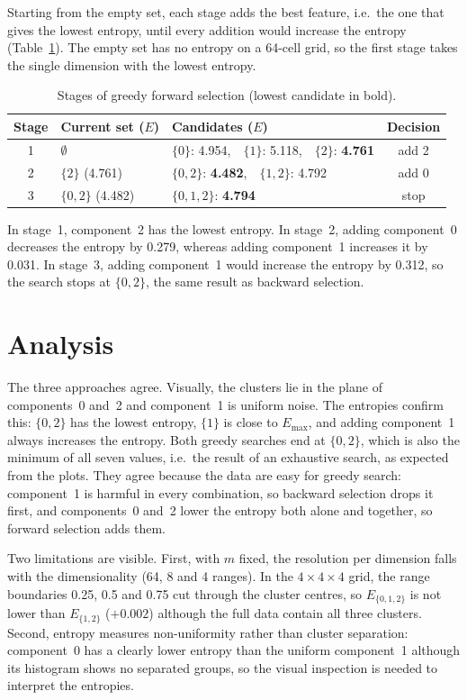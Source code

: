 \documentclass[a4paper,12pt]{article}
\begin{document}
Starting from the empty set, each stage adds the best feature, i.e.\ the
one that gives the lowest entropy, until every addition would increase the
entropy (Table~\ref{tab:forward}). The empty set has no entropy on a
64-cell grid, so the first stage takes the single dimension with the lowest
entropy.

\begin{table}[!ht]
\centering
\caption{Stages of greedy forward selection (lowest candidate in bold).}
\label{tab:forward}
\begin{tabular}{cllc}
\toprule
Stage & Current set ($E$) & Candidates ($E$) & Decision \\
\midrule
1 & $\emptyset$ & $\{0\}$: 4.954,\ \ $\{1\}$: 5.118,\ \ $\{2\}$: \textbf{4.761} & add 2 \\
2 & $\{2\}$ (4.761) & $\{0,2\}$: \textbf{4.482},\ \ $\{1,2\}$: 4.792 & add 0 \\
3 & $\{0,2\}$ (4.482) & $\{0,1,2\}$: \textbf{4.794} & stop \\
\bottomrule
\end{tabular}
\end{table}

In stage~1, component~2 has the lowest entropy. In stage~2, adding
component~0 decreases the entropy by 0.279, whereas adding component~1
increases it by 0.031. In stage~3, adding component~1 would increase the
entropy by 0.312, so the search stops at $\{0,2\}$, the same result as
backward selection.

\section{Analysis}

The three approaches agree. Visually, the clusters lie in the plane of
components~0 and~2 and component~1 is uniform noise. The entropies confirm
this: $\{0,2\}$ has the lowest entropy, $\{1\}$ is close to $E_{\max}$, and
adding component~1 always increases the entropy. Both greedy searches end
at $\{0,2\}$, which is also the minimum of all seven values, i.e.\ the
result of an exhaustive search, as expected from the plots. They agree
because the data are easy for greedy search: component~1 is harmful in
every combination, so backward selection drops it first, and components~0
and~2 lower the entropy both alone and together, so forward selection adds
them.

Two limitations are visible. First, with $m$ fixed, the resolution per
dimension falls with the dimensionality (64, 8 and 4 ranges). In the
$4\times4\times4$ grid, the range boundaries 0.25, 0.5 and 0.75 cut through
the cluster centres, so $E_{\{0,1,2\}}$ is not lower than $E_{\{1,2\}}$
($+0.002$) although the full data contain all three clusters. Second,
entropy measures non-uniformity rather than cluster separation:
component~0 has a clearly lower entropy than the uniform component~1
although its histogram shows no separated groups, so the visual inspection
is needed to interpret the entropies.
\end{document}

